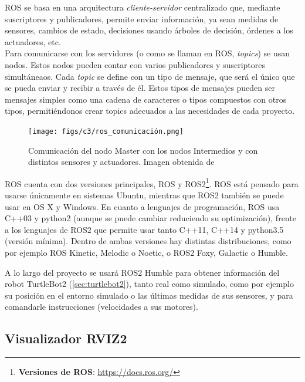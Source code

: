 ROS se basa en una arquitectura \textit{cliente-servidor} centralizado que, mediante suscriptores y publicadores, permite enviar información,
ya sean medidas de sensores, cambios de estado, decisiones usando árboles de decisión, órdenes a los actuadores, etc.\\

Para comunicarse con los servidores (o como se llaman en ROS, \textit{topics}) se usan nodos. Estos nodos pueden contar con varios publicadores y suscriptores
simultáneaos.
Cada \textit{topic} se define con un tipo de mensaje, que será el único que se pueda enviar y recibir a través de él. Estos tipos de mensajes pueden ser
mensajes simples como una cadena de caracteres o tipos compuestos con otros tipos, permitiéndonos crear topics adecuados a las necesidades de cada proyecto.

\begin{figure} [H]
    \begin{center}
        \texttt{[image: figs/c3/ros\_comunicación.png]}
    \end{center}
    \caption[Comunicación entre nodos ROS.]{Comunicación del nodo Master con los nodos Intermedios y con distintos sensores y actuadores. Imagen obtenida de \cite{comunicacion_ros2}}
    \label{fig:ros_master_comunicacion}
\end{figure}
ROS cuenta con dos versiones principales, ROS y ROS2\footnote{\textbf{Versiones de ROS}: \url{https://docs.ros.org/}}. ROS está pensado para usarse
únicamente en sistemas Ubuntu, mientras que ROS2 también se puede usar en OS X y Windows. En cuanto a lenguajes de programación, ROS usa C++03 y
python2 (aunque se puede cambiar reduciendo su optimización), frente a los lenguajes de ROS2 que permite usar tanto C++11, C++14 y python3.5 (versión mínima).
Dentro de ambas versiones hay distintas distribuciones, como por ejemplo ROS Kinetic, Melodic o Noetic, o ROS2 Foxy, Galactic o Humble.

A lo largo del proyecto se usará ROS2 Humble para obtener información del robot TurtleBot2 (\ref{sec:turtlebot2}), tanto real como simulado,
como por ejemplo su posición en el entorno simulado o las últimas medidas de sus sensores, y para comandarle instrucciones (velocidades a sus motores).

\subsection{Visualizador RVIZ2}
\label{subsec:rviz2}

